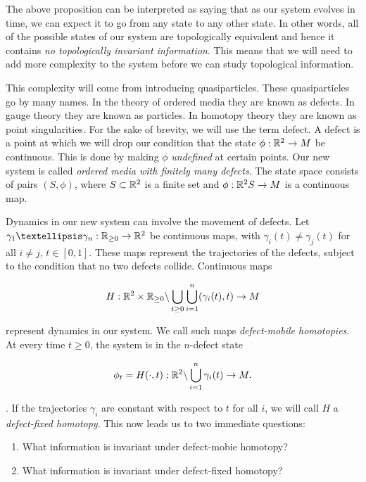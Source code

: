 \documentclass{article}
\theoremstyle{definition}
\numberwithin{figure}{section}
\begin{document}
The above proposition can be interpreted as saying that as our system evolves in time, we can expect it to go from any state to any other state. In other words, all of the possible states of our system are topologically equivalent and hence it contains \textit{no topologically invariant information}. This means that we will need to add more complexity to the system before we can study topological information.

This complexity will come from introducing quasiparticles. These quasiparticles go by many names. In the theory of ordered media they are known as defects. In gauge theory they are known as particles. In homotopy theory they are known as point singularities. For the sake of brevity, we will use the term defect. A defect is a point at which we will drop our condition that the state $\phi:\mathbb{R}^2\to M$ be continuous. This is done by making $\phi$ \textit{undefined} at certain points. Our new system is called \textit{ordered media with finitely many defects}. The state space consists of pairs $(S,\phi)$, where $S\subset \mathbb{R}^2$ is a finite set and $\phi: \mathbb{R}^2\\ S\to M$ is a continuous map.

Dynamics in our new system can involve the movement of defects. Let $\gamma_1… \gamma_n: \RR_{\geq 0} \to \RR^2$ be continuous maps, with $ \gamma_i(t)\neq \gamma_j(t)$ for all $i\neq j$, $t\in [0,1]$. These maps represent the trajectories of the defects, subject to the condition that no two defects collide. Continuous maps

$$H:\mathbb{R}^2\times \mathbb{R}_{\geq 0} \backslash \bigcup_{t\geq 0}\bigcup_{i=1}^{n}(\gamma_i(t),t)\to M$$

represent dynamics in our system. We call such maps \textit{defect-mobile homotopies}. At every time $t\geq 0$, the system is in the $n$-defect state

$$\phi_t=H(\cdot,t): \mathbb{R}^2\backslash \bigcup_{i=1}^{n}\gamma_i(t)\to M.$$

. If the trajectories $\gamma_i$ are constant with respect to $t$ for all $i$, we will call $H$ a \textit{defect-fixed homotopy}. This now leads us to two immediate questions:

\begin{enumerate}
\item What information is invariant under defect-mobie homotopy?
\item What information is invariant under defect-fixed homotopy?
\end{enumerate}
\end{document}
